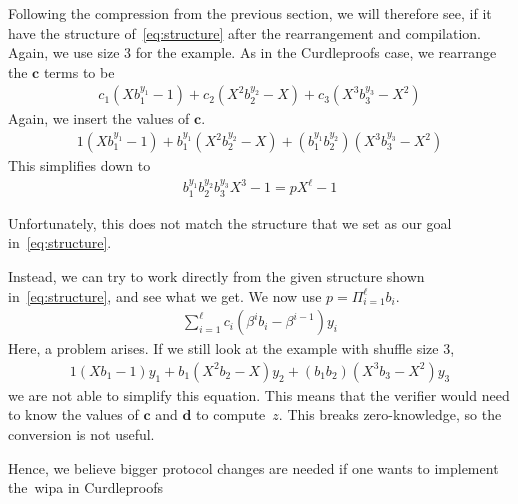 Following the compression from the previous section, we will therefore see, if it have the structure of~\autoref{eq:structure} after the rearrangement and compilation.
Again, we use size 3 for the example.
As in the Curdleproofs case, we rearrange the $\mathbf{c}$ terms to be
\begin{align}
    c_1(X b_1^{y_1}-1)+c_2(X^2 b_2^{y_2}-X)+c_3(X^3 b_3^{y_3}-X^2)
\end{align}
Again, we insert the values of $\mathbf{c}$.
\begin{align}
    1(X b_1^{y_1}-1)+b_1^{y_1}(X^2 b_2^{y_2}-X)+(b_1^{y_1}b_2^{y_2})(X^3 b_3^{y_3}-X^2)
\end{align}
This simplifies down to
\begin{align}
    b_1^{y_1}b_2^{y_2}b_3^{y_3}X^3-1=pX^{\ell}-1
\end{align}

Unfortunately, this does not match the structure that we set as our goal in~\autoref{eq:structure}.

Instead, we can try to work directly from the given structure shown in~\autoref{eq:structure}, and see what we get.
We now use $p=\Pi_{i=1}^\ell b_i$.
\begin{align}
    \sum_{i=1}^{\ell}c_i(\beta^{i}b_i-\beta^{i-1})y_i
\end{align}
Here, a problem arises.
If we still look at the example with shuffle size 3,
\begin{align}
    1(Xb_1-1)y_1+b_1(X^2b_2-X)y_2+(b_1b_2)(X^3b_3-X^2)y_3
\end{align}
we are not able to simplify this equation.
This means that the verifier would need to know the values of $\mathbf{c}$ and $\mathbf{d}$ to compute~$z$.
This breaks zero-knowledge, so the conversion is not useful.

Hence, we believe bigger protocol changes are needed if one wants to implement the~\gls{wipa} in Curdleproofs